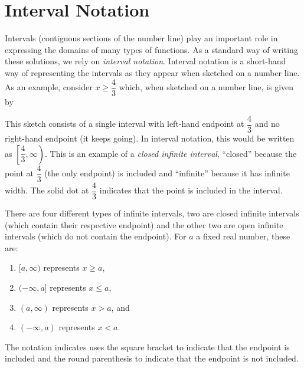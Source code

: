 \documentclass[noauthor, nooutcomes]{ximera}
\begin{document}
	\section{Interval Notation}
Intervals (contiguous sections of the number line) play an important role in expressing the domains of many types of functions. As a standard way of writing these solutions, we rely on \emph{interval notation}. Interval notation
	is a short-hand way of representing the intervals as they appear when sketched on a number line. As an example, consider $x \geq \dfrac{4}{3}$ which, when sketched on a number line, is given by
	\begin{image}
	\end{image}
	This sketch consists of a single interval with left-hand endpoint at $\dfrac{4}{3}$ and no right-hand endpoint (it keeps going). In interval notation, this would be written as $\left[ \dfrac{4}{3}, \infty \right)$. This is an example of a \emph{closed infinite interval}, 
	``closed'' because the point at $\dfrac{4}{3}$ (the only endpoint) is included and ``infinite'' because it has infinite width. The solid dot at $\dfrac{4}{3}$ indicates that the point is included in the interval.
	
	There are four different types of infinite intervals, two are closed infinite intervals (which contain their respective endpoint) and the other two are open infinite intervals (which do not contain the endpoint). For $a$ a fixed real number, these are:
	\begin{enumerate}
		\item $[a, \infty)$ represents $x \geq a$,
		\item $(-\infty, a]$ represents $x \leq a$,
		\item $(a, \infty)$ represents $x > a$, and
		\item $(-\infty, a)$ represents $x < a$.
	\end{enumerate}
	The notation indicates uses the square bracket to indicate that the endpoint is included and the round parenthesis to indicate that the endpoint is not included. 
\end{document}
